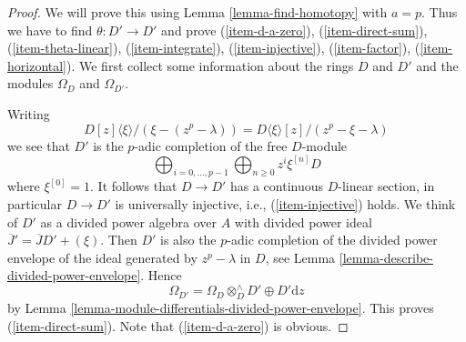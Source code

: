 \documentclass{stacks-project}
\theoremstyle{plain}
\theoremstyle{definition}
\theoremstyle{remark}
\numberwithin{equation}{subsection}
\begin{document}
\begin{proof}
We will prove this using Lemma \ref{lemma-find-homotopy} with $a = p$.
Thus we have to find $\theta : D' \to D'$ and prove
(\ref{item-d-a-zero}), (\ref{item-direct-sum}), (\ref{item-theta-linear}),
(\ref{item-integrate}), (\ref{item-injective}), (\ref{item-factor}),
(\ref{item-horizontal}). We first collect some information about the rings
$D$ and $D'$ and the modules $\Omega_D$ and $\Omega_{D'}$.

\medskip\noindent
Writing
$$
D[z]\langle \xi \rangle/(\xi - (z^p - \lambda))
=
D\langle \xi \rangle[z]/(z^p - \xi - \lambda)
$$
we see that $D'$ is the $p$-adic completion of the free $D$-module
$$
\bigoplus\nolimits_{i = 0, \ldots, p - 1}
\bigoplus\nolimits_{n \geq 0}
z^i \xi^{[n]} D
$$
where $\xi^{[0]} = 1$.
It follows that $D \to D'$ has a continuous $D$-linear section, in particular
$D \to D'$ is universally injective, i.e., (\ref{item-injective}) holds.
We think of $D'$ as a divided power algebra
over $A$ with divided power ideal $\overline{J}' = \overline{J}D' + (\xi)$.
Then $D'$ is also the $p$-adic completion of the divided power envelope
of the ideal generated by $z^p - \lambda$ in $D$, see
Lemma \ref{lemma-describe-divided-power-envelope}. Hence
$$
\Omega_{D'} = \Omega_D \otimes_D^\wedge D' \oplus D'\text{d}z
$$
by Lemma \ref{lemma-module-differentials-divided-power-envelope}.
This proves (\ref{item-direct-sum}). Note that (\ref{item-d-a-zero})
is obvious.


\end{proof}
\end{document}
